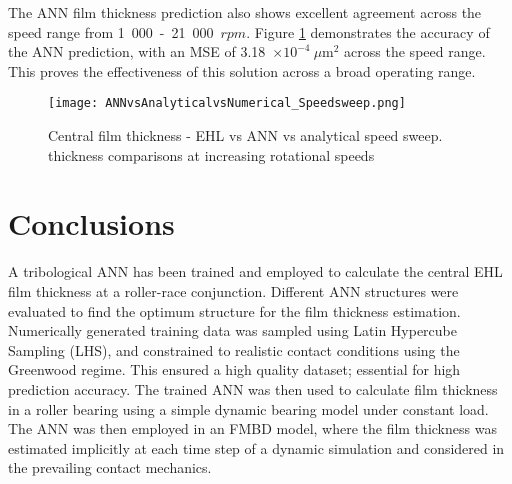 The ANN film thickness prediction also shows excellent agreement across the speed range from 1~000~-~21~000~$rpm$. Figure \ref{ANN Film Thickness Comparisons Speed Sweep} demonstrates the accuracy of the ANN prediction, with an MSE of 3.18~$\times 10^{-4}~\mu \mathrm{m}^2$ across the speed range. This proves the effectiveness of this solution across a broad operating range.

\begin{figure}
	\centering
	\texttt{[image: ANNvsAnalyticalvsNumerical\_Speedsweep.png]}
	\caption{{Central film thickness - EHL vs ANN vs analytical speed sweep.} thickness comparisons at increasing rotational speeds}
	\label{ANN Film Thickness Comparisons Speed Sweep}
\end{figure}

\section{Conclusions}

A tribological ANN has been trained and employed to calculate the central EHL film thickness at a roller-race conjunction. Different ANN structures were evaluated to find the optimum structure for the film thickness estimation. Numerically generated training data was sampled using Latin Hypercube Sampling (LHS), and constrained to realistic contact conditions using the Greenwood regime. This ensured a high quality dataset; essential for high prediction accuracy. The trained ANN was then used to calculate film thickness in a roller bearing using a simple dynamic bearing model under constant load. The ANN was then employed in an FMBD model, where the film thickness was estimated implicitly at each time step of a dynamic simulation and considered in the prevailing contact mechanics.

